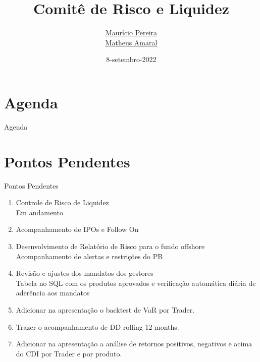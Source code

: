 \documentclass[t,aspectratio=169]{beamer}
\title[Comitê de Risco]{
	Comitê de Risco e Liquidez}
\date{8-setembro-2022}
\author[\href{mailto:risco@asset1.com.br}{risco@asset1.com.br}]{
	\href{mailto:mauricio.pereira@asset1.com.br}{Maurício Pereira}\\
	\vspace{0.12cm}
	\href{mailto:matheus.amaral@asset1.com.br}{Matheus Amaral}
}
\begin{document}

{
	\begin{frame}
		\maketitle
	\end{frame}
}

\section*{Agenda}
\begin{frame}{Agenda}
	\tableofcontents
\end{frame}

\section[Pendências]{Pontos Pendentes}
\begin{frame}{Pontos Pendentes}
	\begin{enumerate}
		\item Controle de Risco de Liquidez\\
		Em andamento
		
		\item {\color{blue1}Acompanhamento de IPOs e Follow On}
		
		\item {\color{blue1}Desenvolvimento de Relatório de Risco para o fundo offshore}\\
		Acompanhamento de alertas e restrições do PB
		
		\item {\color{blue1}Revisão e ajustes dos mandatos dos gestores}\\
		Tabela no SQL com os produtos aprovados e verificação automática diária de aderência aos mandatos
		
		\item Adicionar na apresentação o backtest de VaR por Trader.
		
		\item Trazer o acompanhamento de DD rolling 12 months.
		
		\item Adicionar na apresentação a análise de retornos positivos, negativos e acima do CDI por Trader e por produto. 
		
	\end{enumerate}
\end{frame}
\end{document}

